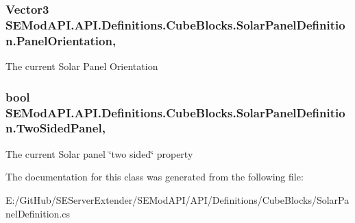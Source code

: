 \subsubsection[{Panel\+Orientation}]{\setlength{\rightskip}{0pt plus 5cm}Vector3 S\+E\+Mod\+A\+P\+I.\+A\+P\+I.\+Definitions.\+Cube\+Blocks.\+Solar\+Panel\+Definition.\+Panel\+Orientation\hspace{0.3cm}{\ttfamily [get]}, {\ttfamily [set]}}\label{class_s_e_mod_a_p_i_1_1_a_p_i_1_1_definitions_1_1_cube_blocks_1_1_solar_panel_definition_a350aa8cd4bbe495fe28606f8d5164301}


The current Solar Panel Orientation 

\hypertarget{class_s_e_mod_a_p_i_1_1_a_p_i_1_1_definitions_1_1_cube_blocks_1_1_solar_panel_definition_a96e7a804a014d579d3592a835aad6bdc}{}
\subsubsection[{Two\+Sided\+Panel}]{\setlength{\rightskip}{0pt plus 5cm}bool S\+E\+Mod\+A\+P\+I.\+A\+P\+I.\+Definitions.\+Cube\+Blocks.\+Solar\+Panel\+Definition.\+Two\+Sided\+Panel\hspace{0.3cm}{\ttfamily [get]}, {\ttfamily [set]}}\label{class_s_e_mod_a_p_i_1_1_a_p_i_1_1_definitions_1_1_cube_blocks_1_1_solar_panel_definition_a96e7a804a014d579d3592a835aad6bdc}


The current Solar panel \char`\"{}two sided\char`\"{} property 



The documentation for this class was generated from the following file\+:\begin{DoxyCompactItemize}
\item 
E\+:/\+Git\+Hub/\+S\+E\+Server\+Extender/\+S\+E\+Mod\+A\+P\+I/\+A\+P\+I/\+Definitions/\+Cube\+Blocks/Solar\+Panel\+Definition.\+cs\end{DoxyCompactItemize}
